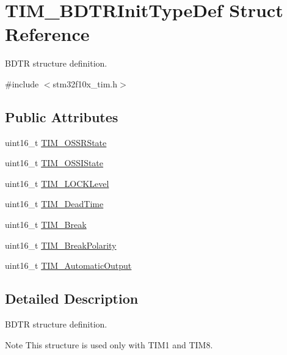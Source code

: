 \hypertarget{struct_t_i_m___b_d_t_r_init_type_def}{}\section{T\+I\+M\+\_\+\+B\+D\+T\+R\+Init\+Type\+Def Struct Reference}
\label{struct_t_i_m___b_d_t_r_init_type_def}


B\+D\+TR structure definition.  




{\ttfamily \#include $<$stm32f10x\+\_\+tim.\+h$>$}

\subsection*{Public Attributes}
\begin{DoxyCompactItemize}
\item 
uint16\+\_\+t \hyperlink{struct_t_i_m___b_d_t_r_init_type_def_a8f34ad7bc4764bd3ff372cadde468072}{T\+I\+M\+\_\+\+O\+S\+S\+R\+State}
\item 
uint16\+\_\+t \hyperlink{struct_t_i_m___b_d_t_r_init_type_def_ad8891e3739a7db8a45343d4e2f9d2824}{T\+I\+M\+\_\+\+O\+S\+S\+I\+State}
\item 
uint16\+\_\+t \hyperlink{struct_t_i_m___b_d_t_r_init_type_def_aa5296a7b194d25b16899f6a98da01f03}{T\+I\+M\+\_\+\+L\+O\+C\+K\+Level}
\item 
uint16\+\_\+t \hyperlink{struct_t_i_m___b_d_t_r_init_type_def_a01ccbaffccdb3068b8a60c912579b1a2}{T\+I\+M\+\_\+\+Dead\+Time}
\item 
uint16\+\_\+t \hyperlink{struct_t_i_m___b_d_t_r_init_type_def_a9fcf20632d0377727476a98f7183be56}{T\+I\+M\+\_\+\+Break}
\item 
uint16\+\_\+t \hyperlink{struct_t_i_m___b_d_t_r_init_type_def_a5731e4e786b66f35cfe4798d6157619e}{T\+I\+M\+\_\+\+Break\+Polarity}
\item 
uint16\+\_\+t \hyperlink{struct_t_i_m___b_d_t_r_init_type_def_a6c056e29af67fd8a32919104ea48eea2}{T\+I\+M\+\_\+\+Automatic\+Output}
\end{DoxyCompactItemize}


\subsection{Detailed Description}
B\+D\+TR structure definition. 

\begin{DoxyNote}{Note}
This structure is used only with T\+I\+M1 and T\+I\+M8. 
\end{DoxyNote}


